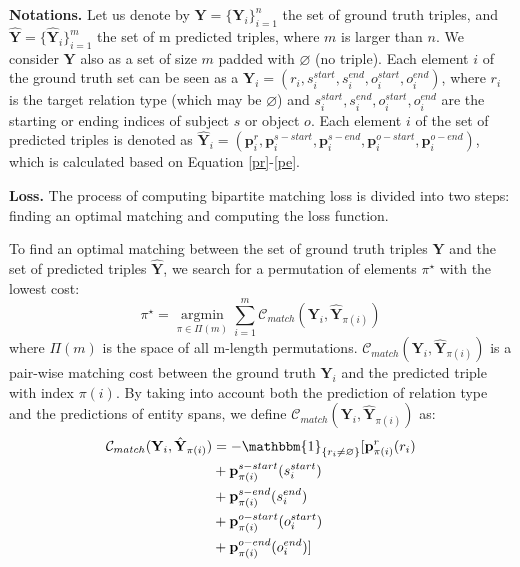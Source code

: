 \documentclass[letterpaper]{article} \usepackage{aaai21}  \usepackage{times}  \usepackage{helvet} \usepackage{courier}  \usepackage[hyphens]{url}  \usepackage{graphicx} \usepackage{amsfonts,amssymb}
\begin{document}
\textbf{Notations.} Let us denote by $\mathbf{Y} = \{\mathbf{Y}_i\}_{i=1}^n$ the set of ground truth triples, and $\hat{\mathbf{Y}} = \{\hat{\mathbf{Y}}_i\}_{i=1}^m$ the set of m predicted triples, where $m$ is larger than $n$. We consider $\mathbf{Y}$ also as a set of size $m$ padded with $\varnothing$ (no triple).  Each element $i$ of the ground truth set can be seen as a $\mathbf{Y}_i = (r_i,s^{start}_i, s^{end}_i,o^{start}_i,o^{end}_i)$,  where $r_i$ is the target relation type (which may be $\varnothing$) and $s^{start}_i, s^{end}_i,o^{start}_i,o^{end}_i$ are the starting or ending indices of subject $s$ or object $o$. Each element $i$ of the set of predicted  triples is denoted as $\hat{\mathbf{Y}}_i =(\mathbf{p}^r_i, \mathbf{p}^{s-start}_i ,\mathbf{p}^{s-end}_i ,\mathbf{p}^{o-start}_i,\mathbf{p}^{o-end}_i)$, which is calculated based on Equation \ref{pr}-\ref{pe}.


\textbf{Loss. } The process of computing bipartite matching loss is divided into two steps: finding an optimal matching and computing the loss function.

To find an optimal matching between the set of ground truth triples $\mathbf{Y}$ and the set of predicted triples $\hat{\mathbf{Y}}$, we search for a permutation of elements $\pi^\star$ with the lowest cost:
\begin{equation}
    \pi^\star = \mathop{\arg \min} \limits_{\pi \in \Pi(m)} \sum \limits_{i=1}^m \mathcal{C}_{match}(\mathbf{Y}_i, \hat{\mathbf{Y}}_{\pi(i)})  
    \label{assignment}
\end{equation}
where $\Pi(m)$ is the space of all m-length permutations.  $\mathcal{C}_{match}(\mathbf{Y}_i, \hat{\mathbf{Y}}_{\pi(i)})$ is a pair-wise matching cost between the ground truth $\mathbf{Y}_i$ and the predicted triple with index $\pi(i)$. By taking into account both the prediction of relation type and the predictions of entity spans, we define $\mathcal{C}_{match}(\mathbf{Y}_i, \hat{\mathbf{Y}}_{\pi(i)})$ as:
\begin{equation}
\begin{split}
     \mathcal{C}_{match}(\mathbf{Y}_i, \hat{\mathbf{Y}}_{\pi(i)})  &= - \mathbbm{1} _{\{r_i \neq \varnothing\}}[\mathbf{p}^r_{\pi(i)}(r_i) \\
    & + \mathbf{p}^{s-start}_{\pi(i)}(s_i^{start})\\
    &+ \mathbf{p}^{s-end}_{\pi(i)}(s_i^{end})\\
    &   + \mathbf{p}^{o-start}_{\pi(i)}(o_i^{start}) \\
    &+ \mathbf{p}^{o-end}_{\pi(i)}(o_i^{end})]
\end{split}
\end{equation}
\end{document}

